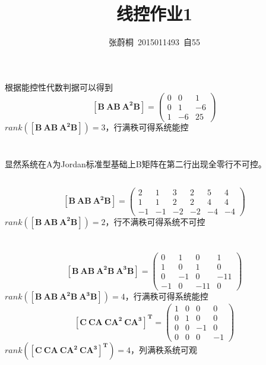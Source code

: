 \documentclass[UTF8,a4paper]{ctexart}
\title{线控作业1}
\author{张蔚桐\ 2015011493\ 自55}
\begin{document}
\maketitle
\section{}
根据能控性代数判据可以得到$$\mathbf{[B \ AB \ A^2B]}=\begin{pmatrix}
0&0&1 \\
0&1&-6 \\
1&-6&25
\end{pmatrix}$$
$rank(\mathbf{[B\  AB\  A^2B]})=3$，行满秩可得系统能控
\section{}
\subsection{}
显然系统在A为Jordan标准型基础上B矩阵在第二行出现全零行不可控。
\subsection{}
$$\mathbf{[B \ AB \ A^2B]}=\begin{pmatrix}
2&1&3&2&5&4 \\
1&1&2&2&4&4 \\
-1&-1&-2&-2&-4&-4
\end{pmatrix}$$
$rank(\mathbf{[B\  AB\  A^2B]})=2$，行不满秩可得系统不可控
\section{}
$$\mathbf{[B \ AB \ A^2B\ A^3B]}=\begin{pmatrix}
0&1&0&1 \\
1&0&1&0 \\
0&-1&0&-11\\
-1&0&-11&0
\end{pmatrix}$$
$rank(\mathbf{[B \ AB \ A^2B\ A^3B]})=4$，行满秩可得系统能控
$$\mathbf{[C \ CA \ CA^2\ CA^3]^T}=\begin{pmatrix}
1&0&0&0\\
0&1&0&0\\
0&0&-1&0\\
0&0&0&-1\end{pmatrix}$$
$rank(\mathbf{[C \ CA \ CA^2\ CA^3]^T})=4$，列满秩系统可观
\section{}
\end{document}
